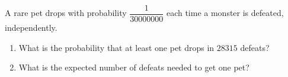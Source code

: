 A rare pet drops with probability $\dfrac1{30000000}$ each time a monster is defeated, independently.
\begin{enumerate}
\item[(a)] What is the probability that at least one pet drops in $28315$ defeats?
\item[(b)] What is the expected number of defeats needed to get one pet?
\end{enumerate}
